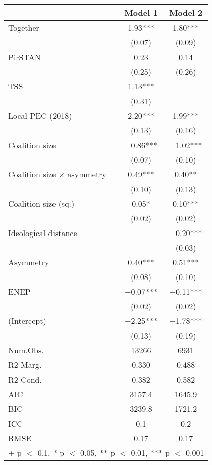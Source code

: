 \begin{table}
\centering
\begin{tabular}[t]{lcc}
\toprule
  & Model 1 & Model 2\\
\midrule
Together & \num{1.93}*** & \num{1.80}***\\
 & (\num{0.07}) & (\num{0.09})\\
PirSTAN & \num{0.23} & \num{0.14}\\
 & (\num{0.25}) & (\num{0.26})\\
TSS & \num{1.13}*** & \\
 & (\num{0.31}) & \\
Local PEC (2018) & \num{2.20}*** & \num{1.99}***\\
 & (\num{0.13}) & (\num{0.16})\\
Coalition size & \num{-0.86}*** & \num{-1.02}***\\
 & (\num{0.07}) & (\num{0.10})\\
Coalition size × asymmetry & \num{0.49}*** & \num{0.40}**\\
 & (\num{0.10}) & (\num{0.13})\\
Coalition size (sq.) & \num{0.05}* & \num{0.10}***\\
 & (\num{0.02}) & \vphantom{1} (\num{0.02})\\
Ideological distance &  & \num{-0.20}***\\
 &  & (\num{0.03})\\
Asymmetry & \num{0.40}*** & \num{0.51}***\\
 & (\num{0.08}) & (\num{0.10})\\
ENEP & \num{-0.07}*** & \num{-0.11}***\\
 & (\num{0.02}) & (\num{0.02})\\
(Intercept) & \num{-2.25}*** & \num{-1.78}***\\
 & (\num{0.13}) & (\num{0.19})\\
\midrule
Num.Obs. & \num{13266} & \num{6931}\\
R2 Marg. & \num{0.330} & \num{0.488}\\
R2 Cond. & \num{0.382} & \num{0.582}\\
AIC & \num{3157.4} & \num{1645.9}\\
BIC & \num{3239.8} & \num{1721.2}\\
ICC & \num{0.1} & \num{0.2}\\
RMSE & \num{0.17} & \num{0.17}\\
\bottomrule
\multicolumn{3}{l}{\rule{0pt}{1em}+ p $<$ 0.1, * p $<$ 0.05, ** p $<$ 0.01, *** p $<$ 0.001}\\
\end{tabular}
\end{table}
